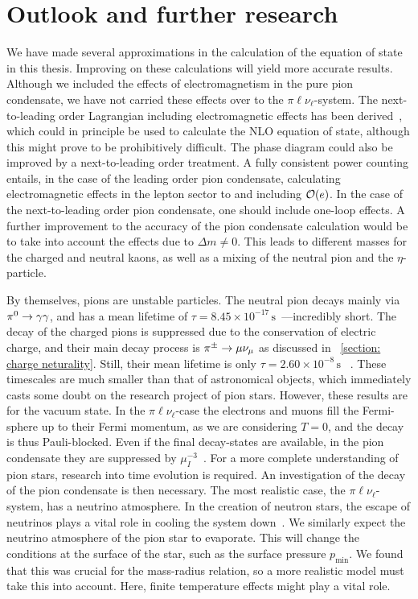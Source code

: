 \section{Outlook and further research}

We have made several approximations in the calculation of the equation of state in this thesis.
Improving on these calculations will yield more accurate results.
Although we included the effects of electromagnetism in the pure pion condensate, we have not carried these effects over to the $\pi\ell\nu_\ell$-system.
The next-to-leading order Lagrangian including electromagnetic effects has been derived~\autocite{urechVirtualPhotonsChiral1995}, which could in principle be used to calculate the NLO equation of state, although this might prove to be prohibitively difficult.
The phase diagram could also be improved by a next-to-leading order treatment.
A fully consistent power counting entails, in the case of the leading order pion condensate, calculating electromagnetic effects in the lepton sector to and including $\mathcal O(e)$.
In the case of the next-to-leading order pion condensate, one should include one-loop effects.
A further improvement to the accuracy of the pion condensate calculation would be to take into account the effects due to $\Delta m \neq 0$.
This leads to different masses for the charged and neutral kaons, as well as a mixing of the neutral pion and the $\eta$-particle.


By themselves, pions are unstable particles.
The neutral pion decays mainly via ${\pi^0}\rightarrow \gamma\gamma$, and has a mean lifetime of $\tau = 8.45\times 10^{-17}\,\text{s}$~\autocite{zylaReviewParticlePhysics2020}---incredibly short.
The decay of the charged pions is suppressed due to the conservation of electric charge, and their main decay process is ${\pi^\pm}\rightarrow \mu \nu_\mu$ as discussed in
%
~\autoref{section: charge neturality}.
%
Still, their mean lifetime is only $\tau = 2.60\times 10^{-8}\,\text{s}$
%
~\autocite{zylaReviewParticlePhysics2020}.
%
These timescales are much smaller than that of astronomical objects, which immediately casts some doubt on the research project of pion stars.
However, these results are for the vacuum state.
In the $\pi\ell\nu_\ell$-case the electrons and muons fill the Fermi-sphere up to their Fermi momentum, as we are considering $T = 0$, and the decay is thus Pauli-blocked.
Even if the final decay-states are available, in the pion condensate they are suppressed by $\mu_I^{-3}$~\autocite{brandtNewClassCompact2018}. 
For a more complete understanding of pion stars, research into time evolution is required.
An investigation of the decay of the pion condensate is then necessary.
The most realistic case, the $\pi\ell\nu_\ell$-system, has a neutrino atmosphere.
In the creation of neutron stars, the escape of neutrinos plays a vital role in cooling the system down~\autocite{glendenningCompactStarsNuclear2012}.
We similarly expect the neutrino atmosphere of the pion star to evaporate.
This will change the conditions at the surface of the star, such as the surface pressure $p_\text{min}$.
We found that this was crucial for the mass-radius relation, so a more realistic model must take this into account.
Here, finite temperature effects might play a vital role.


